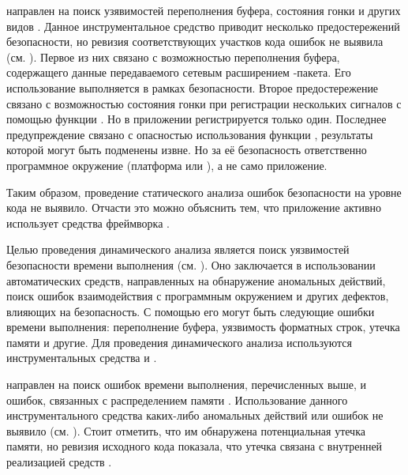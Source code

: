 %
 направлен на поиск узявимостей переполнения буфера, состояния гонки и других видов . 
%
Данное инструментальное средство приводит несколько предостережений безопасности, но ревизия соответствующих участков кода ошибок не выявила (см. ). 
%
Первое из них связано с возможностью переполнения буфера, содержащего данные передаваемого сетевым расширением -пакета. 
%
Его использование выполняется в рамках безопасности. 
%
Второе предостережение связано с возможностью состояния гонки при регистрации нескольких сигналов с помощью функции . 
%
Но в приложении регистрируется только один. 
%
Последнее предупреждение связано с опасностью использования функции , результаты которой могут быть подменены извне. 
%
Но за её безопасность ответственно программное окружение  (платформа или ), а не само приложение.  

%
Таким образом, проведение статического анализа  ошибок безопасности на уровне кода не выявило. 
%
Отчасти это можно объяснить тем, что приложение активно использует средства фреймворка . 



%
Целью проведения динамического анализа является поиск уязвимостей безопасности времени выполнения (см. ). 
%
Оно заключается в использовании автоматических средств, направленных на обнаружение аномальных действий, поиск ошибок взаимодействия с программным окружением и других дефектов, влияющих на безопасность. 
%
С помощью его могут быть следующие ошибки времени выполнения: переполнение буфера, уязвимость форматных строк, утечка памяти и другие. 
%
Для проведения динамического анализа  используются инструментальных средства  и . 

%
 направлен на поиск ошибок времени выполнения, перечисленных выше, и ошибок, связанных с распределением памяти . 
%
Использование данного инструментального средства каких-либо аномальных действий или ошибок не выявило (см. ). 
%
Стоит отметить, что им обнаружена потенциальная утечка памяти, но ревизия исходного кода  показала, что утечка связана с внутренней реализацией средств . 


